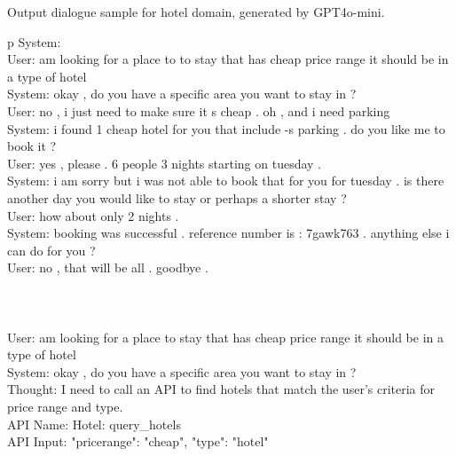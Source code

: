 \begin{table*}
\scriptsize
Output dialogue sample for hotel domain, generated by GPT4o-mini.
\centering
\ttfamily
\begin{tabular}{p\linewidth}
\toprule
System: \\
User: am looking for a place to to stay that has cheap price range it should be in a type of hotel\\
System: okay , do you have a specific area you want to stay in ?\\
User: no , i just need to make sure it s cheap . oh , and i need parking\\
System: i found 1 cheap hotel for you that include -s parking . do you like me to book it ?\\
User: yes , please . 6 people 3 nights starting on tuesday .\\
System: i am sorry but i was not able to book that for you for tuesday . is there another day you would like to stay or perhaps a shorter stay ?\\
User: how about only 2 nights .\\
System: booking was successful . reference number is : 7gawk763 . anything else i can do for you ?\\
User: no , that will be all . goodbye .\\
 \\
 \\
 \\
User: am looking for a place to stay that has cheap price range it should be in a type of hotel  \\
System: okay , do you have a specific area you want to stay in ?  \\
Thought: I need to call an API to find hotels that match the user's criteria for price range and type.  \\
API Name: Hotel: query\_hotels  \\
API Input: {"pricerange": "cheap", "type": "hotel"}  \\

\end{tabular}
\end{table*}
